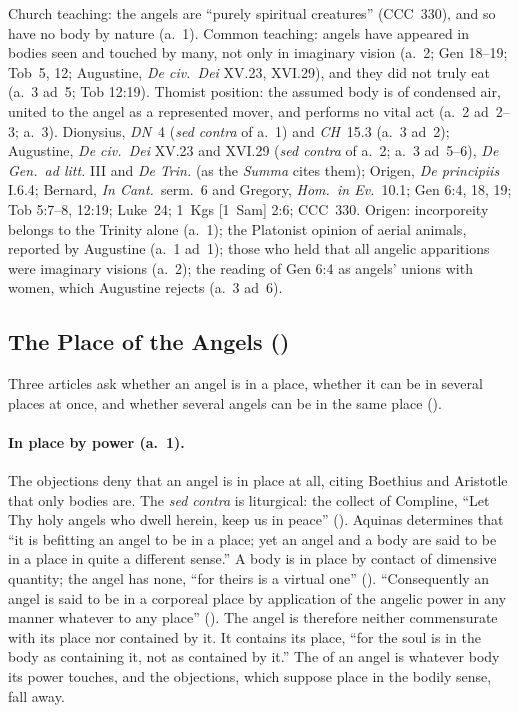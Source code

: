  {Church teaching: the angels are ``purely spiritual creatures''
 (CCC~330), and so have no body by nature (a.~1). Common teaching: angels
 have appeared in bodies seen and touched by many, not only in imaginary
 vision (a.~2; Gen 18--19; Tob~5, 12; Augustine, \emph{De civ.\ Dei}
 XV.23, XVI.29), and they did not truly eat (a.~3 ad~5; Tob 12:19).
 Thomist position: the assumed body is of condensed air, united to the
 angel as a represented mover, and performs no vital act (a.~2 ad~2--3;
 a.~3).}
 {Dionysius, \emph{DN}~4 (\emph{sed contra} of a.~1) and \emph{CH}~15.3
 (a.~3 ad~2); Augustine, \emph{De civ.\ Dei} XV.23 and XVI.29 (\emph{sed
 contra} of a.~2; a.~3 ad~5--6), \emph{De Gen.\ ad litt.} III and
 \emph{De Trin.} (as the \emph{Summa} cites them);
 Origen, \emph{De principiis} I.6.4; Bernard, \emph{In Cant.}\ serm.~6 and
 Gregory, \emph{Hom.\ in Ev.}\ 10.1; Gen 6:4, 18,
 19; Tob 5:7--8, 12:19; Luke~24; 1~Kgs [1~Sam] 2:6; CCC~330.}
 {Origen: incorporeity belongs to the Trinity alone (a.~1); the Platonist
 opinion of aerial animals, reported by Augustine (a.~1 ad~1); those who
 held that all angelic apparitions were imaginary visions (a.~2); the
 reading of Gen 6:4 as angels' unions with women, which Augustine rejects
 (a.~3 ad~6).}

\subsection{The Place of the Angels ()}\label{sec:q52}

Three articles ask whether an angel is in a place, whether it can be in
several places at once, and whether several angels can be in the same
place ().

\paragraph{In place by power (a.~1).} The objections deny that an angel is
in place at all, citing Boethius and Aristotle that only bodies are. The
\emph{sed contra} is liturgical: the collect of Compline, ``Let Thy holy
angels who dwell herein, keep us in peace'' (). Aquinas determines that ``it is
befitting an angel to be in a place; yet an angel and a body are said to be
in a place in quite a different sense.'' A body is in place by contact of
dimensive quantity; the angel has none, ``for theirs is a virtual one''
(). ``Consequently an angel is
said to be in a corporeal place by application of the angelic power in any
manner whatever to any place'' (). The angel is therefore neither
commensurate with its place nor contained by it. It contains its place,
``for the soul is in the body as containing it, not as contained by it.''
The  of an angel is whatever body its power touches, and the
objections, which suppose place in the bodily sense, fall away.

